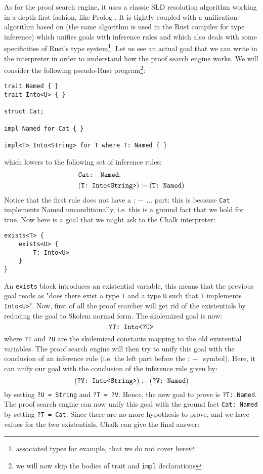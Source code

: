 \documentclass[twocolumn]{article}
\newcommand{\rust}[1]{\texttt{#1}}
\newcommand{\mrust}[1]{\text{\rust{#1}}}
\newcommand{\pif}[0]{:\!\!-\,}
\begin{document}
As for the proof search engine, it uses a classic SLD resolution algorithm working in a depth-first fashion, like Prolog \cite{sld}. It is tightly coupled with a unification algorithm based on \cite{robinson} (the same algorithm is used in the Rust compiler for type inference) which unifies goals with inference rules and which also deals with some specificities of Rust's type system\footnote{associated types for example, that we do not cover here}. Let us see an actual goal that we can write in the interpreter in order to understand how the proof search engine works. We will consider the following pseudo-Rust program\footnote{we will now skip the bodies of trait and \rust{impl} declarations}:
\begin{verbatim}
trait Named { }
trait Into<U> { }

struct Cat;

impl Named for Cat { }

impl<T> Into<String> for T where T: Named { }
\end{verbatim}
which lowers to the following set of inference rules:
\[
    \begin{aligned}
    & \mrust{Cat: Named}. \\
    & (\mrust{T: Into<String>}) \pif (\mrust{T: Named})
    \end{aligned}
\]
Notice that the first rule does not have a $\pif ...$ part: this is because \rust{Cat} implements {Named} unconditionally, i.e. this is a ground fact that we hold for true. Now here is a goal that we might ask to the Chalk interpreter:
\begin{verbatim}
exists<T> {
    exists<U> {
        T: Into<U>
    }
}
\end{verbatim}
An \rust{exists} block introduces an existential variable, this means that the previous goal reads as "does there exist a type \rust{T} and a type \rust{U} such that \rust{T} implements \rust{Into<U>}". Now, first of all the proof searcher will get rid of the existentials by reducing the goal to Skolem normal form. The skolemized goal is now:
\[
\mrust{?T: Into<?U>}
\]
where \rust{?T} and \rust{?U} are the skolemized constants mapping to the old existential variables. The proof search engine will then try to unify this goal with the conclusion of an inference rule (i.e. the left part before the $\pif$ symbol). Here, it can unify our goal with the conclusion of the inference rule given by:
\[
(\mrust{?V: Into<String>}) \pif (\mrust{?V: Named})
\]
by setting \rust{?U = String} and \rust{?T = ?V}. Hence, the new goal to prove is \rust{?T: Named}. The proof search engine can now unify this goal with the ground fact \rust{Cat: Named} by setting \rust{?T = Cat}. Since there are no more hypothesis to prove, and we have values for the two existentials, Chalk can give the final answer:
\end{document}
